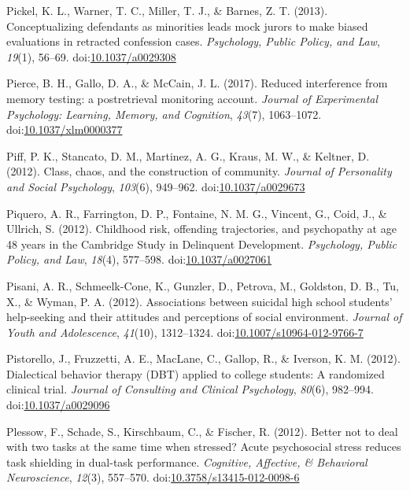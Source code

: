 \documentclass[english,man]{apa6}
\theoremstyle{definition}
\theoremstyle{definition}
\theoremstyle{definition}
\theoremstyle{remark}
\begin{document}
\hypertarget{ref-Pickel2013}{}
Pickel, K. L., Warner, T. C., Miller, T. J., \& Barnes, Z. T. (2013).
Conceptualizing defendants as minorities leads mock jurors to make
biased evaluations in retracted confession cases. \emph{Psychology,
Public Policy, and Law}, \emph{19}(1), 56--69.
doi:\href{https://doi.org/10.1037/a0029308}{10.1037/a0029308}

\hypertarget{ref-Pierce2017}{}
Pierce, B. H., Gallo, D. A., \& McCain, J. L. (2017). Reduced
interference from memory testing: a postretrieval monitoring account.
\emph{Journal of Experimental Psychology: Learning, Memory, and
Cognition}, \emph{43}(7), 1063--1072.
doi:\href{https://doi.org/10.1037/xlm0000377}{10.1037/xlm0000377}

\hypertarget{ref-Piff2012}{}
Piff, P. K., Stancato, D. M., Martinez, A. G., Kraus, M. W., \& Keltner,
D. (2012). Class, chaos, and the construction of community.
\emph{Journal of Personality and Social Psychology}, \emph{103}(6),
949--962. doi:\href{https://doi.org/10.1037/a0029673}{10.1037/a0029673}

\hypertarget{ref-Piquero2012}{}
Piquero, A. R., Farrington, D. P., Fontaine, N. M. G., Vincent, G.,
Coid, J., \& Ullrich, S. (2012). Childhood risk, offending trajectories,
and psychopathy at age 48 years in the Cambridge Study in Delinquent
Development. \emph{Psychology, Public Policy, and Law}, \emph{18}(4),
577--598. doi:\href{https://doi.org/10.1037/a0027061}{10.1037/a0027061}

\hypertarget{ref-Pisani2012}{}
Pisani, A. R., Schmeelk-Cone, K., Gunzler, D., Petrova, M., Goldston, D.
B., Tu, X., \& Wyman, P. A. (2012). Associations between suicidal high
school students' help-seeking and their attitudes and perceptions of
social environment. \emph{Journal of Youth and Adolescence},
\emph{41}(10), 1312--1324.
doi:\href{https://doi.org/10.1007/s10964-012-9766-7}{10.1007/s10964-012-9766-7}

\hypertarget{ref-Pistorello2012}{}
Pistorello, J., Fruzzetti, A. E., MacLane, C., Gallop, R., \& Iverson,
K. M. (2012). Dialectical behavior therapy (DBT) applied to college
students: A randomized clinical trial. \emph{Journal of Consulting and
Clinical Psychology}, \emph{80}(6), 982--994.
doi:\href{https://doi.org/10.1037/a0029096}{10.1037/a0029096}

\hypertarget{ref-Plessow2012}{}
Plessow, F., Schade, S., Kirschbaum, C., \& Fischer, R. (2012). Better
not to deal with two tasks at the same time when stressed? Acute
psychosocial stress reduces task shielding in dual-task performance.
\emph{Cognitive, Affective, \& Behavioral Neuroscience}, \emph{12}(3),
557--570.
doi:\href{https://doi.org/10.3758/s13415-012-0098-6}{10.3758/s13415-012-0098-6}
\end{document}
